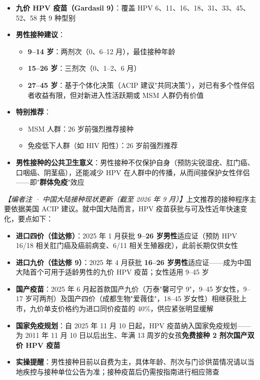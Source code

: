 \begin{itemize}[leftmargin=2cm]
	\item \textbf{九价 HPV 疫苗（Gardasil 9）}：覆盖 HPV 6、11、16、18、31、33、45、52、58 共 9 种型别
	\item \textbf{男性接种建议}：
	\begin{itemize}
		\item \textbf{9--14 岁}：两剂次（0、6--12 月），最佳接种年龄
		\item \textbf{15--26 岁}：三剂次（0、1--2、6 月）
		\item \textbf{27--45 岁}：基于个体化决策（ACIP 建议"共同决策"），对已有多个性伴侣者收益有限，但对新进入性活跃期或 MSM 人群仍有价值
	\end{itemize}
	\item \textbf{特别推荐}：
	\begin{itemize}
		\item MSM 人群：26 岁前强烈推荐接种
		\item 免疫低下人群（如 HIV 阳性）：26 岁前强烈推荐
	\end{itemize}
	\item \textbf{男性接种的公共卫生意义}：男性接种不仅保护自身（预防尖锐湿疣、肛门癌、口咽癌、阴茎癌），还能减少 HPV 在人群中的传播，从而间接保护女性伴侣——即"\textbf{群体免疫}"效应
\end{itemize}

\noindent\textit{【编者注 · 中国大陆接种现状更新（截至 2026 年 9 月）】}上文推荐的接种程序主要依据美国 ACIP 建议。就中国大陆而言，HPV 疫苗获批与可及性近年快速变化，要点如下：

\begin{itemize}[leftmargin=2cm]
	\item \textbf{进口四价（佳达修）}：2025 年 1 月获批 \textbf{9--26 岁男性}适应证（预防 HPV 16/18 相关肛门癌及癌前病变、6/11 相关生殖器疣），此前长期仅供女性
	\item \textbf{进口九价（佳达修 9）}：2025 年 4 月获批 \textbf{16--26 岁男性}适应证——成为中国大陆首个可用于适龄男性的九价 HPV 疫苗；女性适用 9--45 岁
	\item \textbf{国产疫苗}：2025 年 6 月起首款国产九价（万泰"馨可宁 9"，9--45 岁女性，9--17 岁可两剂）及国产四价（成都生物"爱薇佳"，18--45 岁女性）相继获批上市，九价单支价格约为进口同价疫苗的 40\%，供应紧张明显缓解
	\item \textbf{国家免疫规划}：自 2025 年 11 月 10 日起，HPV 疫苗纳入国家免疫规划——为 2011 年 11 月 10 日以后出生、年满 13 周岁的女孩\textbf{免费接种 2 剂次国产双价 HPV 疫苗}
	\item \textbf{实操提醒}：男性接种目前以自费为主，具体年龄、剂次与门诊供苗情况请以当地疾控与接种单位公告为准；接种疫苗后仍需按指南进行相应筛查
\end{itemize}

